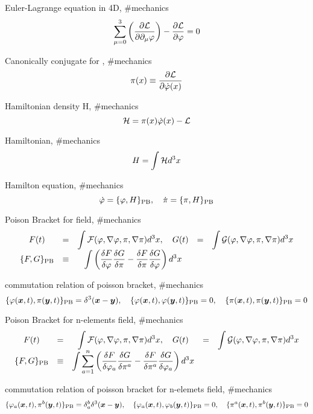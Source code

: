 Euler-Lagrange equation in 4D, #mechanics
$$
\sum^3_{\mu=0}\left(\frac{\partial {\cal L}}{\partial\partial_\mu \varphi}\right)-\frac{\partial{\cal L}}{\partial\varphi}=0
$$

Canonically conjugate for \varphi, #mechanics
$$
\pi(x)\equiv\frac{\partial{\cal L}}{\partial\dot{\varphi}(x)}
$$

Hamiltonian density {\cal H}, #mechanics
$$
{\cal H}=\pi(x){\dot \varphi}(x)-{\cal L}
$$

Hamiltonian, #mechanics
$$
H=\int{\cal H}d^3x
$$

Hamilton equation, #mechanics
$$
{\dot \varphi}=\{\varphi,H\}_{\rm PB}, \quad {\dot \pi}=\{\pi,H\}_{\rm PB}
$$

Poison Bracket for field, #mechanics
$$
\begin{array}{ccccc}
F(t)&=&\displaystyle\int{\cal F}(\varphi,\nabla\varphi,\pi,\nabla\pi)d^3x,\quad G(t)&=&\displaystyle\int{\cal G}(\varphi,\nabla\varphi,\pi,\nabla\pi)d^3x \\
\{F,G\}_{\rm PB}&\equiv&\displaystyle\int\left(\frac{\delta F}{\delta \varphi}\frac{\delta G}{\delta \pi}-\frac{\delta F}{\delta \pi}\frac{\delta G}{\delta \varphi}\right)d^3x
\end{array}
$$

commutation relation of poisson bracket, #mechanics
$$
\{\varphi({\boldsymbol x},t),\pi({\boldsymbol y},t)\}_{\rm PB}=\delta^3({\boldsymbol x}-{\boldsymbol y}), \quad \{\varphi({\boldsymbol x},t),\varphi({\boldsymbol y},t)\}_{\rm PB}=0,\quad \{\pi({\boldsymbol x},t),\pi({\boldsymbol y},t)\}_{\rm PB}=0
$$

Poison Bracket for n-elements field, #mechanics
$$
\begin{array}{ccccc}
F(t)&=&\displaystyle\int{\cal F}(\varphi,\nabla\varphi,\pi,\nabla\pi)d^3x,\quad G(t)&=&\displaystyle\int{\cal G}(\varphi,\nabla\varphi,\pi,\nabla\pi)d^3x \\
\{F,G\}_{\rm PB}&\equiv&\displaystyle\int\sum^n_{a=1}\left(\frac{\delta F}{\delta \varphi_a}\frac{\delta G}{\delta \pi^a}-\frac{\delta F}{\delta \pi^a}\frac{\delta G}{\delta \varphi_a}\right)d^3x
\end{array}
$$

commutation relation of poisson bracket for n-elemets field, #mechanics
$$
\{\varphi_a({\boldsymbol x},t),\pi^b({\boldsymbol y},t)\}_{\rm PB}=\delta_a^b\delta^3({\boldsymbol x}-{\boldsymbol y}), \quad \{\varphi_a({\boldsymbol x},t),\varphi_b({\boldsymbol y},t)\}_{\rm PB}=0,\quad \{\pi^a({\boldsymbol x},t),\pi^b({\boldsymbol y},t)\}_{\rm PB}=0
$$

